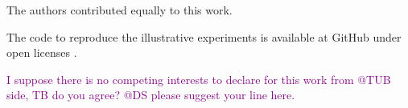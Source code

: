 \documentclass[pdflatex,sn-basic, Numbered]{sn-jnl}%
\theoremstyle{thmstyleone}%
\theoremstyle{thmstyletwo}%
\theoremstyle{thmstylethree}%
\newcommand{\comment}[1]{\textcolor{purple}{#1}}
\begin{document}
 The authors contributed equally to this work.

 The code to reproduce the illustrative experiments is available at GitHub under open licenses \cite{code247CFE}.

 \comment{I suppose there is no competing interests to declare for this work from @TUB side, TB do you agree? @DS please suggest your line here.}



\end{document}
